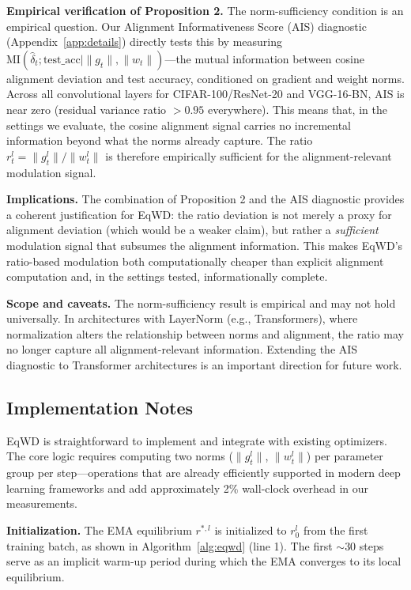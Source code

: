 \documentclass{article}
\begin{document}
\textbf{Empirical verification of Proposition 2.} The norm-sufficiency
condition is an empirical question. Our Alignment Informativeness Score
(AIS) diagnostic (Appendix~\ref{app:details}) directly tests this by measuring
$\text{MI}(\hat{\delta}_t; \text{test\_acc} \mid \|g_t\|, \|w_t\|)$---the
mutual information between cosine alignment deviation and test accuracy,
conditioned on gradient and weight norms. Across all convolutional
layers for CIFAR-100/ResNet-20 and VGG-16-BN, AIS is near zero (residual
variance ratio $> 0.95$ everywhere). This means that, in the settings
we evaluate, the cosine alignment signal carries no incremental
information beyond what the norms already capture. The ratio
$r_t^l = \|g_t^l\| / \|w_t^l\|$ is therefore empirically sufficient
for the alignment-relevant modulation signal.

\textbf{Implications.} The combination of Proposition 2 and the AIS
diagnostic provides a coherent justification for EqWD: the ratio
deviation is not merely a proxy for alignment deviation (which would be
a weaker claim), but rather a \emph{sufficient} modulation signal that
subsumes the alignment information. This makes EqWD's ratio-based
modulation both computationally cheaper than explicit alignment
computation and, in the settings tested, informationally complete.

\textbf{Scope and caveats.} The norm-sufficiency result is empirical and
may not hold universally. In architectures with LayerNorm (e.g.,
Transformers), where normalization alters the relationship between norms
and alignment, the ratio may no longer capture all alignment-relevant
information. Extending the AIS diagnostic to Transformer architectures
is an important direction for future work.

\subsection{Implementation Notes}
\label{sec:implementation}

EqWD is straightforward to implement and integrate with existing
optimizers. The core logic requires computing two norms ($\|g_t^l\|$,
$\|w_t^l\|$) per parameter group per step---operations that are
already efficiently supported in modern deep learning frameworks and add
approximately 2\% wall-clock overhead in our measurements.

\textbf{Initialization.} The EMA equilibrium $r^{*,l}$ is initialized
to $r_0^l$ from the first training batch, as shown in Algorithm~\ref{alg:eqwd}
(line 1). The first ${\sim}30$ steps serve as an implicit warm-up period
during which the EMA converges to its local equilibrium.
\end{document}

